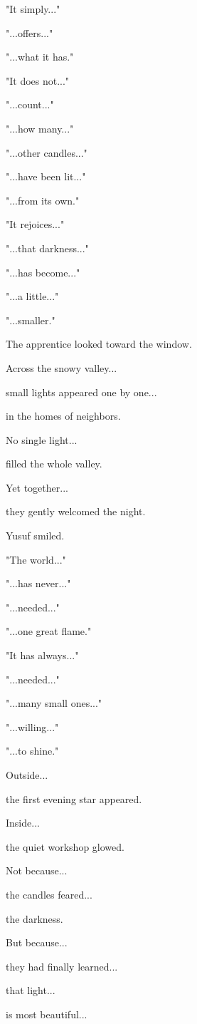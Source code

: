\documentclass[12pt,openany]{book}
\begin{document}
"It simply..."

"...offers..."

"...what it has."

"It does not..."

"...count..."

"...how many..."

"...other candles..."

"...have been lit..."

"...from its own."

"It rejoices..."

"...that darkness..."

"...has become..."

"...a little..."

"...smaller."

The apprentice looked toward the window.

Across the snowy valley...

small lights appeared one by one...

in the homes of neighbors.

No single light...

filled the whole valley.

Yet together...

they gently welcomed the night.

Yusuf smiled.

"The world..."

"...has never..."

"...needed..."

"...one great flame."

"It has always..."

"...needed..."

"...many small ones..."

"...willing..."

"...to shine."

Outside...

the first evening star appeared.

Inside...

the quiet workshop glowed.

Not because...

the candles feared...

the darkness.

But because...

they had finally learned...

that light...

is most beautiful...
\end{document}
